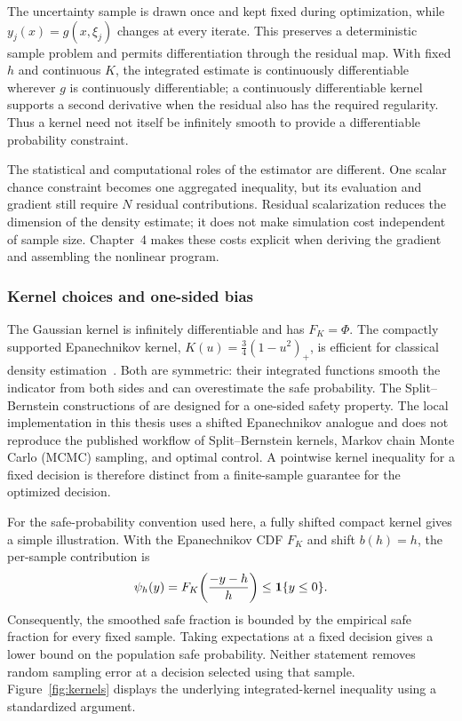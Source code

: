 The uncertainty sample is drawn once and kept fixed during optimization, while $y_j(x)=g(x,\xi_j)$ changes at every iterate. This preserves a deterministic sample problem and permits differentiation through the residual map. With fixed $h$ and continuous $K$, the integrated estimate is continuously differentiable wherever $g$ is continuously differentiable; a continuously differentiable kernel supports a second derivative when the residual also has the required regularity. Thus a kernel need not itself be infinitely smooth to provide a differentiable probability constraint.

The statistical and computational roles of the estimator are different. One scalar chance constraint becomes one aggregated inequality, but its evaluation and gradient still require $N$ residual contributions. Residual scalarization reduces the dimension of the density estimate; it does not make simulation cost independent of sample size. Chapter~4 makes these costs explicit when deriving the gradient and assembling the nonlinear program.

\subsubsection{Kernel choices and one-sided bias}
\label{ssec:kernels}

The Gaussian kernel is infinitely differentiable and has $F_K=\Phi$. The compactly supported Epanechnikov kernel, $K(u)=\tfrac34(1-u^2)_+$, is efficient for classical density estimation~\citep{epanechnikov1969}. Both are symmetric: their integrated functions smooth the indicator from both sides and can overestimate the safe probability. The Split--Bernstein constructions of \citet{keil2020,keil2021} are designed for a one-sided safety property. The local implementation in this thesis uses a shifted Epanechnikov analogue and does not reproduce the published workflow of Split--Bernstein kernels, Markov chain Monte Carlo (MCMC) sampling, and optimal control. A pointwise kernel inequality for a fixed decision is therefore distinct from a finite-sample guarantee for the optimized decision.

For the safe-probability convention used here, a fully shifted compact kernel gives a simple illustration. With the Epanechnikov CDF $F_K$ and shift $b(h)=h$, the per-sample contribution is
\begin{equation}
 \psi_h(y)=F_K\!\left(\frac{-y-h}{h}\right)
 \leq\mathbf{1}\{y\leq0\}.
 \label{eq:ch3-kernel-envelope}
\end{equation}
Consequently, the smoothed safe fraction is bounded by the empirical safe fraction for every fixed sample. Taking expectations at a fixed decision gives a lower bound on the population safe probability. Neither statement removes random sampling error at a decision selected using that sample. Figure~\ref{fig:kernels} displays the underlying integrated-kernel inequality using a standardized argument.


